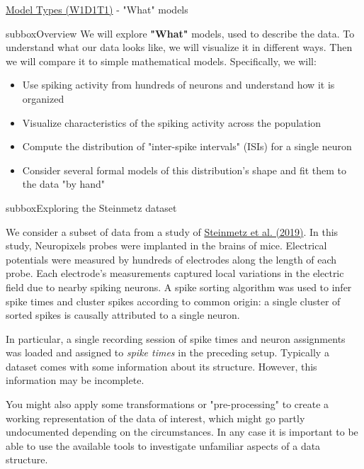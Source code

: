 \begin{textbox}{\href{https://compneuro.neuromatch.io/tutorials/W1D1_ModelTypes/student/W1D1_Tutorial1.html}{Model Types (W1D1T1)} -  "What" models}
\begin{subbox}{subbox}{Overview}
\scriptsize
We will explore \textbf{"What"} models, used to describe the data. To understand what our data looks like, we will visualize it in different ways. Then we will compare it to simple mathematical models. Specifically, we will:
\begin{itemize}
    \item 
Use spiking activity from hundreds of neurons and understand how it is organized
\item Visualize characteristics of the spiking activity across the population
\item Compute the distribution of "inter-spike intervals" (ISIs) for a single neuron
\item Consider several formal models of this distribution's shape and fit them to the data "by hand"
\end{itemize}

\end{subbox}

\begin{subbox}{subbox}{Exploring the Steinmetz dataset}
\scriptsize

We consider a subset of data from a study of \href{https://www.nature.com/articles/s41586-019-1787-x}{Steinmetz et al. (2019)}. In this study, Neuropixels probes were implanted in the brains of mice. Electrical potentials were measured by hundreds of electrodes along the length of each probe. Each electrode's measurements captured local variations in the electric field due to nearby spiking neurons. A spike sorting algorithm was used to infer spike times and cluster spikes according to common origin: a single cluster of sorted spikes is causally attributed to a single neuron.

In particular, a single recording session of spike times and neuron assignments was loaded and assigned to \textit{spike times} in the preceding setup.
Typically a dataset comes with some information about its structure. However, this information may be incomplete.

You might also apply some transformations or "pre-processing" to create a working representation of the data of interest, which might go partly undocumented depending on the circumstances. In any case it is important to be able to use the available tools to investigate unfamiliar aspects of a data structure.

\end{subbox}




\end{textbox}
